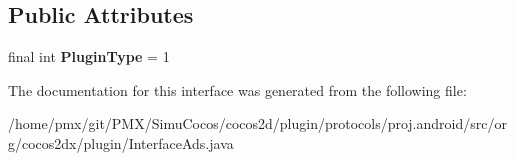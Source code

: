 \subsection*{Public Attributes}
\begin{DoxyCompactItemize}
\item 
\mbox{\label{interfaceorg_1_1cocos2dx_1_1plugin_1_1InterfaceAds_adca74a6ec3d33a452d304e90d3b8ea74}} 
final int {\bfseries Plugin\+Type} = 1
\end{DoxyCompactItemize}


The documentation for this interface was generated from the following file\+:\begin{DoxyCompactItemize}
\item 
/home/pmx/git/\+P\+M\+X/\+Simu\+Cocos/cocos2d/plugin/protocols/proj.\+android/src/org/cocos2dx/plugin/Interface\+Ads.\+java\end{DoxyCompactItemize}
